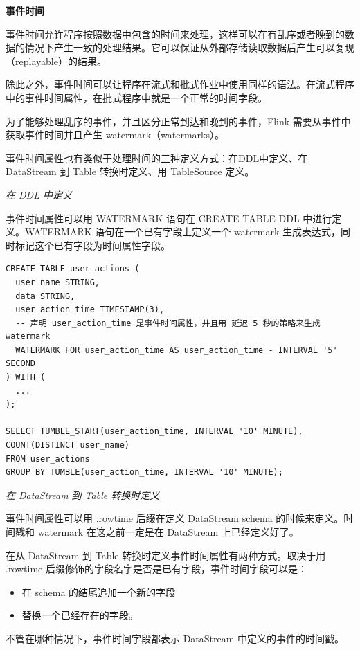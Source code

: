 \documentclass[cn,11pt,chinese]{elegantbook}
\begin{document}
\textbf{事件时间}

事件时间允许程序按照数据中包含的时间来处理，这样可以在有乱序或者晚到的数据的情况下产生一致的处理结果。它可以保证从外部存储读取数据后产生可以复现（replayable）的结果。

除此之外，事件时间可以让程序在流式和批式作业中使用同样的语法。在流式程序中的事件时间属性，在批式程序中就是一个正常的时间字段。

为了能够处理乱序的事件，并且区分正常到达和晚到的事件，Flink 需要从事件中获取事件时间并且产生 watermark（watermarks）。

事件时间属性也有类似于处理时间的三种定义方式：在DDL中定义、在 DataStream 到 Table 转换时定义、用 TableSource 定义。

\textit{在 DDL 中定义}

事件时间属性可以用 WATERMARK 语句在 CREATE TABLE DDL 中进行定义。WATERMARK 语句在一个已有字段上定义一个 watermark 生成表达式，同时标记这个已有字段为时间属性字段。

\begin{verbatim}
CREATE TABLE user_actions (
  user_name STRING,
  data STRING,
  user_action_time TIMESTAMP(3),
  -- 声明 user_action_time 是事件时间属性，并且用 延迟 5 秒的策略来生成 watermark
  WATERMARK FOR user_action_time AS user_action_time - INTERVAL '5' SECOND
) WITH (
  ...
);

SELECT TUMBLE_START(user_action_time, INTERVAL '10' MINUTE), COUNT(DISTINCT user_name)
FROM user_actions
GROUP BY TUMBLE(user_action_time, INTERVAL '10' MINUTE);
\end{verbatim}

\textit{在 DataStream 到 Table 转换时定义}

事件时间属性可以用 .rowtime 后缀在定义 DataStream schema 的时候来定义。时间戳和 watermark 在这之前一定是在 DataStream 上已经定义好了。

在从 DataStream 到 Table 转换时定义事件时间属性有两种方式。取决于用 .rowtime 后缀修饰的字段名字是否是已有字段，事件时间字段可以是：

\begin{itemize}
    \item 在 schema 的结尾追加一个新的字段
    \item 替换一个已经存在的字段。
\end{itemize}

不管在哪种情况下，事件时间字段都表示 DataStream 中定义的事件的时间戳。
\end{document}
